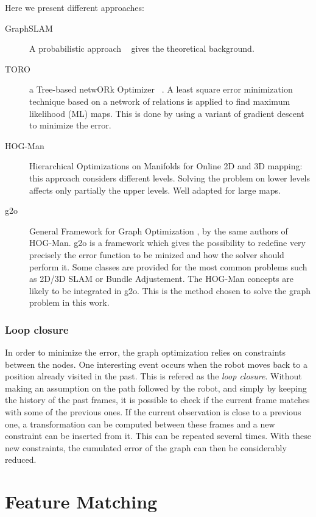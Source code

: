 Here we present different approaches:
\begin{description}
\item[GraphSLAM] A probabilistic approach ~\cite{Thrun_2005} gives the theoretical background.
\item[TORO] a Tree-based netwORk Optimizer ~\cite{grisetti07rss}. A least square error minimization technique based on a network of relations is applied to find maximum likelihood (ML) maps. This is done by using a variant of gradient descent to minimize the error.
\item[HOG-Man] Hierarchical Optimizations on Manifolds for Online 2D and 3D mapping\cite{hogman_2010}: this approach considers different levels. Solving the problem on lower levels affects only partially the upper levels. Well adapted for large maps.
\item[g2o] General Framework for Graph Optimization \cite{g2o_2011}, by the same authors of HOG-Man\cite{hogman_2010}. g2o is a framework which gives the possibility to redefine very precisely the error function to be minized and how the solver should perform it. Some classes are provided for the most common problems such as 2D/3D SLAM or Bundle Adjustement. The HOG-Man concepts are likely to be integrated in g2o. This is the method chosen to solve the graph problem in this work.
\end{description}

\subsection{Loop closure}
In order to minimize the error, the graph optimization relies on constraints between the nodes. One interesting event occurs when the robot moves back to a position already visited in the past. This is refered as the \emph{loop closure}. Without making an assumption on the path followed by the robot, and simply by keeping the history of the past frames, it is possible to check if the current frame matches with some of the previous ones. If the current observation is close to a previous one, a transformation can be computed between these frames and a new constraint can be inserted from it. This can be repeated several times. With these new constraints, the cumulated error of the graph can then be considerably reduced. 

\chapter{Feature Matching}
\label{chap:features}

